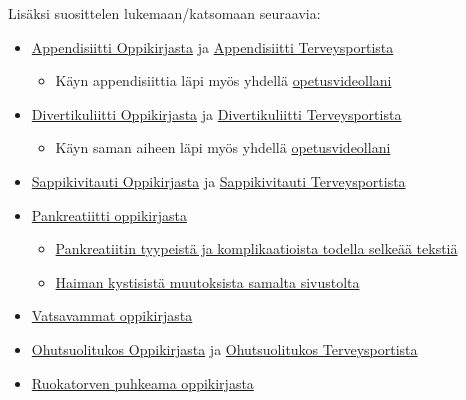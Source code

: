 \documentclass[
]{book}
\providecommand{\tightlist}{%
  \setlength{\itemsep}{0pt}\setlength{\parskip}{0pt}}
\begin{document}
Lisäksi suosittelen lukemaan/katsomaan seuraavia:

\begin{itemize}
\tightlist
\item
  \href{https://www.oppiportti.fi/oppikirjat/kia00574}{Appendisiitti Oppikirjasta} ja \href{https://www.terveysportti.fi/apps/dtk/ltk/article/ykt01830/}{Appendisiitti Terveysportista}

  \begin{itemize}
  \tightlist
  \item
    Käyn appendisiittia läpi myös yhdellä \href{https://youtu.be/gaZSuMsmqxs?si=PzhfOyi5jeTcGUZ0}{opetusvideollani}
  \end{itemize}
\item
  \href{https://www.oppiportti.fi/oppikirjat/kia00578}{Divertikuliitti Oppikirjasta} ja \href{https://www.terveysportti.fi/apps/dtk/ltk/article/ykt00252}{Divertikuliitti Terveysportista}

  \begin{itemize}
  \tightlist
  \item
    Käyn saman aiheen läpi myös yhdellä \href{https://youtu.be/DiQRv9rV0MM?si=rQVCLc2kcOdz_fE8&t=333}{opetusvideollani}
  \end{itemize}
\item
  \href{https://www.oppiportti.fi/oppikirjat/kia00627}{Sappikivitauti Oppikirjasta} ja \href{https://www.terveysportti.fi/apps/dtk/ltk/article/ykt00265/}{Sappikivitauti Terveysportista}
\item
  \href{https://www.oppiportti.fi/oppikirjat/kia00634}{Pankreatiitti oppikirjasta}

  \begin{itemize}
  \tightlist
  \item
    \href{https://radiologyassistant.nl/abdomen/pancreas/acute-pancreatitis}{Pankreatiitin tyypeistä ja komplikaatioista todella selkeää tekstiä}
  \item
    \href{https://radiologyassistant.nl/abdomen/pancreas/pancreas-cystic-lesions}{Haiman kystisistä muutoksista samalta sivustolta}
  \end{itemize}
\item
  \href{https://www.oppiportti.fi/oppikirjat/kia00537}{Vatsavammat oppikirjasta}
\item
  \href{https://www.oppiportti.fi/oppikirjat/kia00569}{Ohutsuolitukos Oppikirjasta} ja \href{https://www.terveysportti.fi/apps/dtk/ltk/article/ykt00251/}{Ohutsuolitukos Terveysportista}
\item
  \href{https://www.oppiportti.fi/oppikirjat/kia00549}{Ruokatorven puhkeama oppikirjasta}
\end{itemize}
\end{document}
